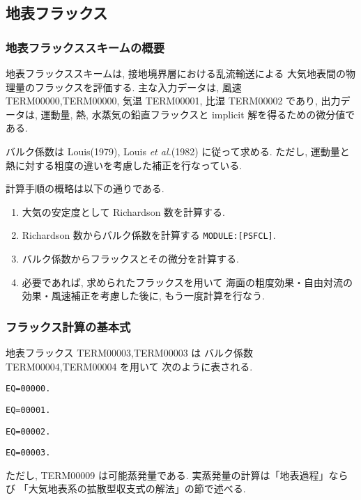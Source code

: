 ﻿
\subsection{地表フラックス}

\subsubsection{地表フラックススキームの概要}

地表フラックススキームは, 
接地境界層における乱流輸送による
大気地表間の物理量のフラックスを評価する.
主な入力データは, 風速 TERM00000,TERM00000, 気温 TERM00001, 比湿 TERM00002 であり,
出力データは, 運動量, 熱, 水蒸気の鉛直フラックスと
implicit 解を得るための微分値である.

バルク係数は Louis(1979), Louis {\em et al.}(1982) に従って求める. 
ただし, 運動量と熱に対する粗度の違いを考慮した補正を行なっている. 

計算手順の概略は以下の通りである.
\begin{enumerate}
\item 大気の安定度として
      Richardson 数を計算する.
\item Richardson 数からバルク係数を計算する \texttt{MODULE:[PSFCL]}.
\item バルク係数からフラックスとその微分を計算する.
\item 必要であれば, 求められたフラックスを用いて
      海面の粗度効果・自由対流の効果・風速補正を考慮した後に,
      もう一度計算を行なう.
\end{enumerate}

\subsubsection{フラックス計算の基本式}

地表フラックス TERM00003,TERM00003 は
バルク係数 TERM00004,TERM00004 を用いて
次のように表される.
%
\begin{verbatim}
EQ=00000.
\end{verbatim}
\begin{verbatim}
EQ=00001.
\end{verbatim}
\begin{verbatim}
EQ=00002.
\end{verbatim}
\begin{verbatim}
EQ=00003.
\end{verbatim}
%
ただし, TERM00009 は可能蒸発量である.
実蒸発量の計算は「地表過程」ならび
「大気地表系の拡散型収支式の解法」の節で述べる.

